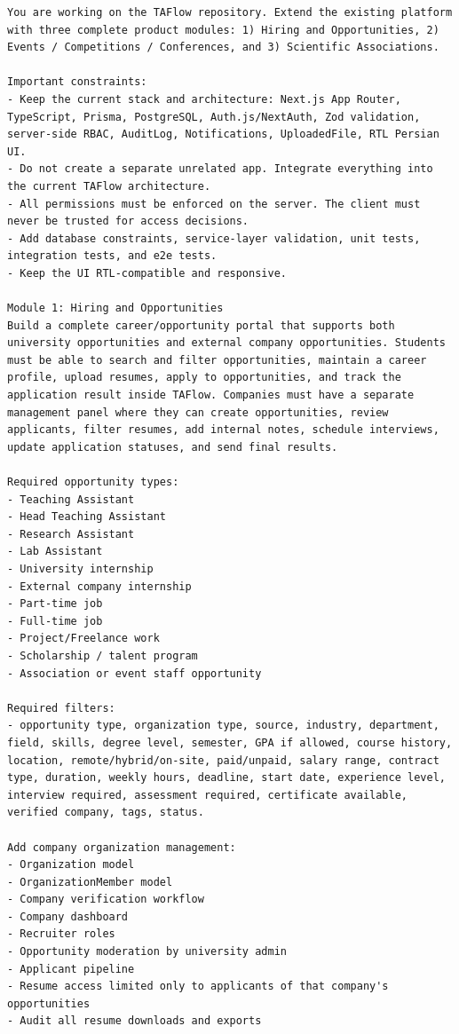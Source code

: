 \documentclass[12pt,a4paper]{article}
\begin{document}
\begin{LTR}
\begin{lstlisting}
You are working on the TAFlow repository. Extend the existing platform with three complete product modules: 1) Hiring and Opportunities, 2) Events / Competitions / Conferences, and 3) Scientific Associations.

Important constraints:
- Keep the current stack and architecture: Next.js App Router, TypeScript, Prisma, PostgreSQL, Auth.js/NextAuth, Zod validation, server-side RBAC, AuditLog, Notifications, UploadedFile, RTL Persian UI.
- Do not create a separate unrelated app. Integrate everything into the current TAFlow architecture.
- All permissions must be enforced on the server. The client must never be trusted for access decisions.
- Add database constraints, service-layer validation, unit tests, integration tests, and e2e tests.
- Keep the UI RTL-compatible and responsive.

Module 1: Hiring and Opportunities
Build a complete career/opportunity portal that supports both university opportunities and external company opportunities. Students must be able to search and filter opportunities, maintain a career profile, upload resumes, apply to opportunities, and track the application result inside TAFlow. Companies must have a separate management panel where they can create opportunities, review applicants, filter resumes, add internal notes, schedule interviews, update application statuses, and send final results.

Required opportunity types:
- Teaching Assistant
- Head Teaching Assistant
- Research Assistant
- Lab Assistant
- University internship
- External company internship
- Part-time job
- Full-time job
- Project/Freelance work
- Scholarship / talent program
- Association or event staff opportunity

Required filters:
- opportunity type, organization type, source, industry, department, field, skills, degree level, semester, GPA if allowed, course history, location, remote/hybrid/on-site, paid/unpaid, salary range, contract type, duration, weekly hours, deadline, start date, experience level, interview required, assessment required, certificate available, verified company, tags, status.

Add company organization management:
- Organization model
- OrganizationMember model
- Company verification workflow
- Company dashboard
- Recruiter roles
- Opportunity moderation by university admin
- Applicant pipeline
- Resume access limited only to applicants of that company's opportunities
- Audit all resume downloads and exports


\end{lstlisting}
\end{LTR}
\end{document}
